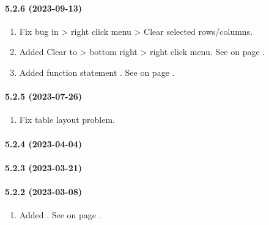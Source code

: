 \paragraph{5.2.6 (2023-09-13)}  %
\begin{enumerate}
\item Fix bug in \TABLE{} > right click menu > Clear selected rows/columns.
\item Added Clear to \TABLE{} > bottom right > right click menu.
      See  on page \pageref{par:uitablemenubottomright}.
\item Added function statement \BEEP.
      See  on page \pageref{dia:systemstatement}.
\end{enumerate}

\paragraph{5.2.5 (2023-07-26)}  %
\begin{enumerate}
\item Fix table layout problem.
\end{enumerate}

\paragraph{5.2.4 (2023-04-04)}  %

\paragraph{5.2.3 (2023-03-21)}  %

\paragraph{5.2.2 (2023-03-08)}  %
\begin{enumerate}
\item Added \RESTJWTLOGON.
      See  on page \pageref{dia:restServiceaction}.
\end{enumerate}


